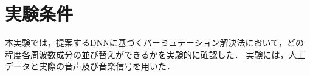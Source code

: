 \section{実験条件}
\label{sec:ex_condition}
本実験では，提案するDNNに基づくパーミュテーション解決法において，どの程度各周波数成分の並び替えができるかを実験的に確認した．
実験には，人工データと実際の音声及び音楽信号を用いた．
